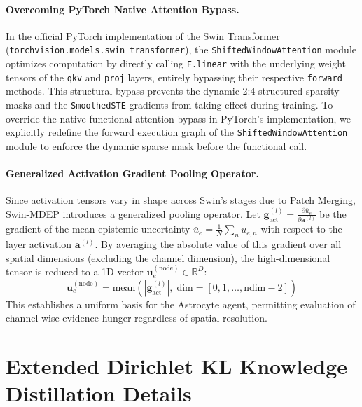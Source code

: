 \documentclass[letterpaper]{article} %
\newcommand{\R}{\mathbb{R}}
\begin{document}
\paragraph{Overcoming PyTorch Native Attention Bypass.}
In the official PyTorch implementation of the Swin Transformer (\texttt{torchvision.models.swin\_transformer}), the \texttt{ShiftedWindowAttention} module optimizes computation by directly calling \texttt{F.linear} with the underlying weight tensors of the \texttt{qkv} and \texttt{proj} layers, entirely bypassing their respective \texttt{forward} methods. This structural bypass prevents the dynamic 2:4 structured sparsity masks and the \texttt{SmoothedSTE} gradients from taking effect during training. To override the native functional attention bypass in PyTorch's implementation, we explicitly redefine the forward execution graph of the \texttt{ShiftedWindowAttention} module to enforce the dynamic sparse mask before the functional call.

\paragraph{Generalized Activation Gradient Pooling Operator.}
Since activation tensors vary in shape across Swin's stages due to Patch Merging, Swin-MDEP introduces a generalized pooling operator. Let $\bm{g}_{\text{act}}^{(l)} = \frac{\partial \bar{u}_e}{\partial \bm{a}^{(l)}}$ be the gradient of the mean epistemic uncertainty $\bar{u}_e = \frac{1}{N}\sum_n u_{e,n}$ with respect to the layer activation $\bm{a}^{(l)}$. By averaging the absolute value of this gradient over all spatial dimensions (excluding the channel dimension), the high-dimensional tensor is reduced to a 1D vector $\bm{u}_e^{(\text{node})} \in \R^D$:
\begin{equation}\label{eq:activation_pooling}
    \bm{u}_e^{(\text{node})} = \text{mean}\!\left(|\bm{g}_{\text{act}}^{(l)}|,\; \text{dim}=[0, 1, \ldots, \text{ndim}-2]\right)
\end{equation}
This establishes a uniform basis for the Astrocyte agent, permitting evaluation of channel-wise evidence hunger regardless of spatial resolution.


\section{Extended Dirichlet KL Knowledge Distillation Details}
\end{document}

